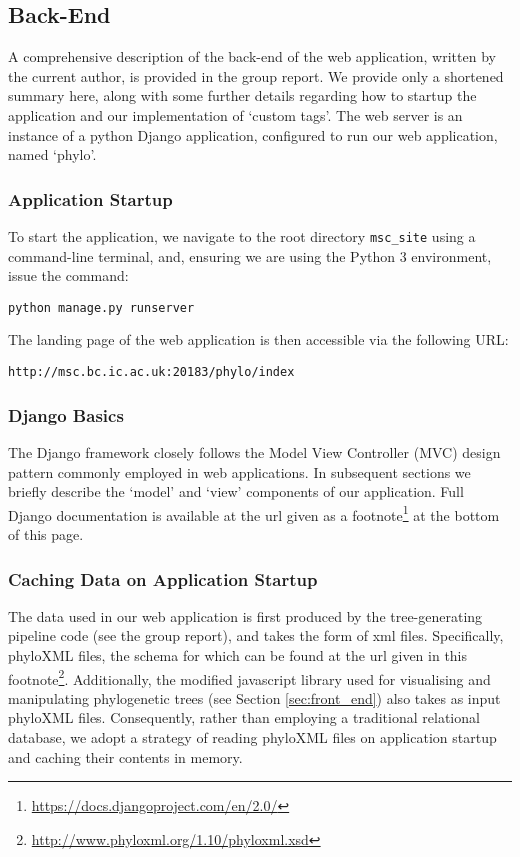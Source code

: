 \documentclass[12pt,a4paper]{article}
\begin{document}
\subsection{Back-End}
\label{sec:back_end}
A comprehensive description of the back-end of the web application, written by the current author, is provided in the group report. We provide only a shortened summary here, along with some further details regarding how to startup the application and our implementation of `custom tags'. The web server is an instance of a python Django application, configured to run our web application, named `phylo'.

\subsubsection{Application Startup}
\label{sec:startup}
To start the application, we navigate to the root directory \texttt{msc\_site} using a command-line terminal, and, ensuring we are using the Python 3 environment, issue the command:

\begin{verbatim}
python manage.py runserver
\end{verbatim}

\noindent The landing page of the web application is then accessible via the following URL:

\begin{verbatim}
http://msc.bc.ic.ac.uk:20183/phylo/index
\end{verbatim}

\subsubsection{Django Basics}
\label{sec:django_basics}
The Django framework closely follows the Model View Controller (MVC) \citep{krasner1988description} design pattern commonly employed in web applications. In subsequent sections we briefly describe the `model' and `view' components of our application. Full Django documentation is available at the url given as a footnote\footnote{\url{https://docs.djangoproject.com/en/2.0/}} at the bottom of this page.

\subsubsection{Caching Data on Application Startup}
\label{sec:startup}
The data used in our web application is first produced by the tree-generating pipeline code (see the group report), and takes the form of xml files. Specifically, phyloXML files, the schema for which can be found at the url given in this footnote\footnote{\url{http://www.phyloxml.org/1.10/phyloxml.xsd}}. Additionally, the modified javascript library used for visualising and manipulating phylogenetic trees (see Section \ref{sec:front_end}) also takes as input phyloXML files. Consequently, rather than employing a traditional relational database, we adopt a strategy of reading phyloXML files on application startup and caching their contents in memory.
\end{document}
